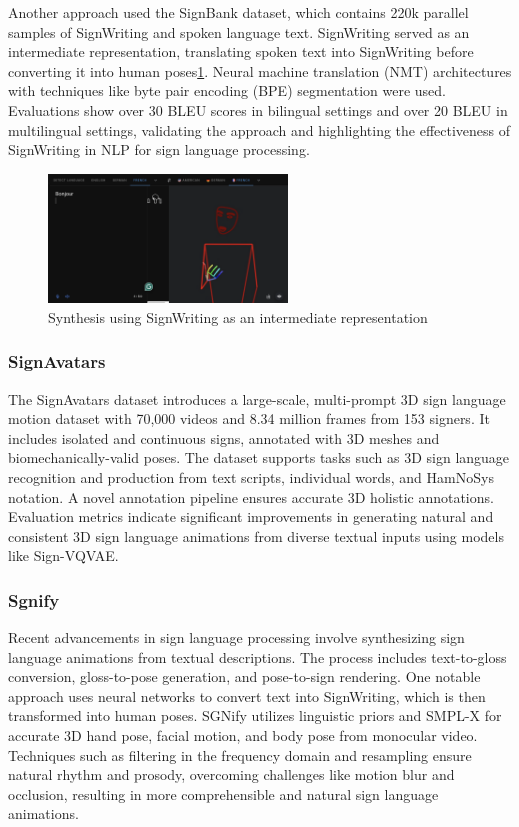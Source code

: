 \documentclass[../../main.tex]{subfiles}
\begin{document}
Another approach\cite{jiang-etal-2023-machine} used the SignBank dataset, which contains 220k parallel samples of SignWriting and spoken language text. SignWriting served as an intermediate representation, translating spoken text into SignWriting before converting it into human poses\ref{fig:sw_synthesis}. Neural machine translation (NMT) architectures with techniques like byte pair encoding (BPE) segmentation were used. Evaluations show over 30 BLEU scores in bilingual settings and over 20 BLEU in multilingual settings, validating the approach and highlighting the effectiveness of SignWriting in NLP for sign language processing.

\begin{figure}
  \centering \includegraphics[width = 2.5in]{chapters/background_work/images/sign_writing_synthesis.png}
  \caption{Synthesis using SignWriting as an intermediate representation}
  \label{fig:sw_synthesis}
\end{figure}

\subsubsection{SignAvatars}

The SignAvatars dataset introduces a large-scale, multi-prompt 3D sign language motion dataset with 70,000 videos and 8.34 million frames from 153 signers. It includes isolated and continuous signs, annotated with 3D meshes and biomechanically-valid poses. The dataset supports tasks such as 3D sign language recognition and production from text scripts, individual words, and HamNoSys notation. A novel annotation pipeline ensures accurate 3D holistic annotations. Evaluation metrics indicate significant improvements in generating natural and consistent 3D sign language animations from diverse textual inputs using models like Sign-VQVAE.

\subsubsection{Sgnify}

Recent advancements in sign language processing involve synthesizing sign language animations from textual descriptions. The process includes text-to-gloss conversion, gloss-to-pose generation, and pose-to-sign rendering. One notable approach uses neural networks to convert text into SignWriting, which is then transformed into human poses. SGNify utilizes linguistic priors and SMPL-X for accurate 3D hand pose, facial motion, and body pose from monocular video. Techniques such as filtering in the frequency domain and resampling ensure natural rhythm and prosody, overcoming challenges like motion blur and occlusion, resulting in more comprehensible and natural sign language animations.
\end{document}
